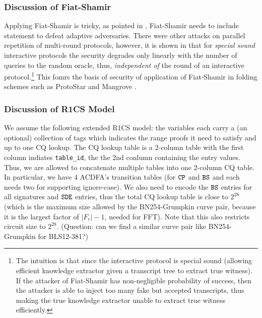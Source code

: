 {\subsubsection{Discussion of Fiat-Shamir}
Applying Fiat-Shamir is tricky, as pointed in \cite{WeakFS},
Fiat-Shamir needs to include statement to defeat adaptive adversaries.
There were other attacks on parallel repetition of multi-round
protocols, however, it is shown in \cite{SpecialFiat} that
for {\em special sound} interactive protocols the security degrades
only linearly with the number of queries to the random oracle,
thus, {\em independent of} the round of an interactive protocol.\footnote{The intuition is that since the interactive protocol is special sound (allowing
efficient knowledge extractor given a transcript tree to extract true
witness). If the attacker of Fiat-Shamir has non-negligible probability
of success, then the attacker is able to inject too many fake 
but accepted transcripts, thus making the true knowledge extractor
unable to extract true witness efficiently.}
This fomrs the basis of security of application of Fiat-Shamir
in folding schemes such as ProtoStar \cite{ProtoStar}
and Mangrove \cite{Mangrove}.

\subsubsection{Discussion of R1CS Model}
We assume the following extended R1CS model: the variables each carry
a (an optional) collection of tags which indicates the range proofs 
it need to satisfy and up to one CQ lookup. The CQ lookup table
is a 2-column table with the first column indiates \texttt{table\_id},
the the 2nd conlumn containing the entry values. Thus, we are
allowed to concatenate multiple tables into one 2-column CQ table.
In particular, we have 4 ACDFA's transition tables (for $\texttt{CP}$
and $\texttt{BS}$ and each needs two for supporting ignore-case). We also
need to encode the $\texttt{BS}$ entries for all signatures and $\texttt{SDE}$
entries, thus the total CQ lookup table is close to $2^{28}$ (which is
the maximum size allowed by the BN254-Grumpkin curve pair, because
it is the largest factor of $|F_r|-1$, needed for FFT).
Note that this also restricts circuit size to $2^{28}$. (Question:
can we find a similar curve pair like BN254-Grumpkin for
BLS12-381?)
{
}}
